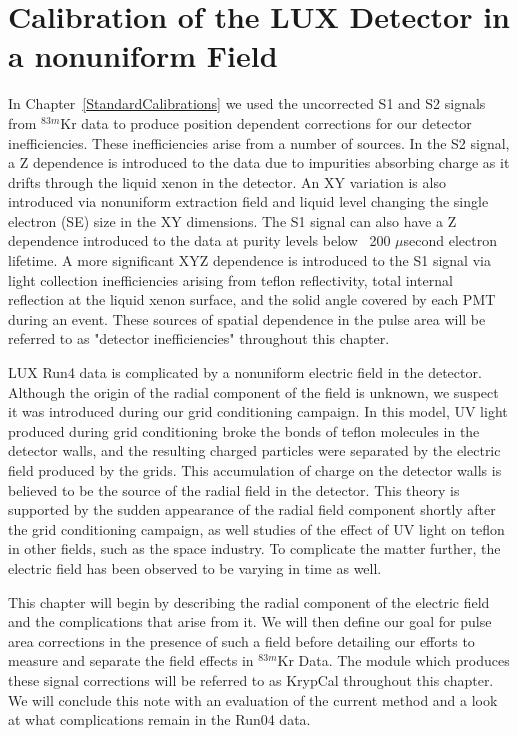 \section{Calibration of the LUX Detector in a nonuniform Field} \label{Run04Corrections}

In Chapter~\ref{StandardCalibrations} we used the uncorrected S1 and S2 signals from $^{83m}$Kr data to produce position dependent corrections for our detector inefficiencies.  These inefficiencies arise from a number of sources.  In the S2 signal, a Z dependence is introduced to the data due to impurities absorbing charge as it drifts through the liquid xenon in the detector.  An XY variation is also introduced via nonuniform extraction field and liquid level changing the single electron (SE) size in the XY dimensions.  The S1 signal can also have a Z dependence introduced to the data at purity levels below ~200 $\mu$second electron lifetime.  A more significant XYZ dependence is introduced to the S1 signal via light collection inefficiencies arising from teflon reflectivity, total internal reflection at the liquid xenon surface, and the solid angle covered by each PMT during an event.  These sources of spatial dependence in the pulse area will be referred to as "detector inefficiencies" throughout this chapter.

LUX Run4 data is complicated by a nonuniform electric field in the detector.  Although the origin of the radial component of the field is unknown, we suspect it was introduced during our grid conditioning campaign.  In this model, UV light produced during grid conditioning broke the bonds of teflon molecules in the detector walls, and the resulting charged particles were separated by the electric field produced by the grids.  This accumulation of charge on the detector walls is believed to be the source of the radial field in the detector.  This theory is supported by the sudden appearance of the radial field component shortly after the grid conditioning campaign, as well studies of the effect of UV light on teflon in other fields, such as the space industry.  \cite{GridCond, Dever}  To complicate the matter further, the electric field has been observed to be varying in time as well.

  
This chapter will begin by describing the radial component of the electric field and the complications that arise from it.  We will then define our goal for pulse area corrections  in the presence of such a field before detailing our efforts to measure and separate the field effects in  $^{83m}$Kr Data.  The module which produces these signal corrections will be referred to as KrypCal throughout this chapter.  We will conclude this note with an evaluation of the current method and a look at what complications remain in the Run04 data.

